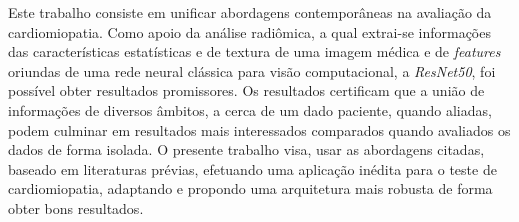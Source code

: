 \begin{resumo}
Este trabalho consiste em unificar abordagens contemporâneas na avaliação da cardiomiopatia. Como apoio da análise radiômica, a qual extrai-se informações das características estatísticas e de textura de uma imagem médica e de \textit{features} oriundas de uma rede neural clássica para visão computacional, a \textit{ResNet50}, foi possível obter resultados promissores. Os resultados certificam que a união de informações de diversos âmbitos, a cerca de um dado paciente, quando aliadas, podem culminar em resultados mais interessados comparados quando avaliados os dados de forma isolada. O presente trabalho visa, usar as abordagens citadas, baseado em literaturas prévias, efetuando uma aplicação inédita para o teste de cardiomiopatia, adaptando e propondo uma arquitetura mais robusta de forma obter bons resultados.

 
\end{resumo}